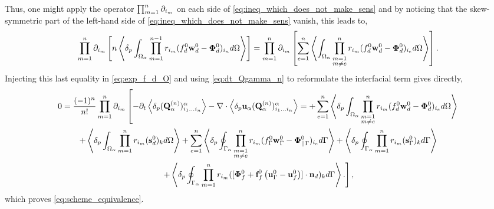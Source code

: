 Thus, one might apply the operator $\prod_{m=1}^{n} \partial_{i_m}$ on each side of \ref{eq:ineq_which_does_not_make_sens} and by noticing that the skew-symmetric part of the left-hand side of \ref{eq:ineq_which_does_not_make_sens} vanish, this leads to, 
\begin{equation*}
    \partialp{1}{n}\left[
        n\pavg{\int_{\Omega_\alpha} \pri{1}{n-1} ( f_d^0 \textbf{w}_d^0-\bm\Phi_d^0)_{i_n} d\Omega}
        \right]
    =
    \partialp{1}{n}\left[
    \sum_{e=1}^{n} 
    \avg{
        \intO{
        \prod^{n}_{\substack{ m=1 \\m \neq e}} r_{i_m} (f_d^0 \textbf{w}_d^0  - \bm\Phi_d^0)_{i_e}
        }
    }
    \right]. 
    \label{eq:it_make_sens_again}
\end{equation*}
Injecting this last equality in \ref{eq:exp_f_d_O} and using \ref{eq:dt_Qgamma_n} to reformulate the interfacial term gives directly, 
\begin{multline}
    0 = \frac{(-1)^n}{n!}
    \prod_{m=1}^{n} \partial_{i_m}
    \left[
        - \partial_t \left<\delta_p (\textbf{Q}_\alpha^{(n)})_{i_1\ldots i_n}^\alpha\right>
        - \mathbf{\nabla}\cdot  \left<\delta_p \textbf{u}_\alpha (\textbf{Q}_\alpha^{(n)})_{i_1\ldots i_n}^\alpha\right>
        =+\sum_{e=1}^{n} 
        \left<\delta_p \int_{\Omega_{\alpha}} 
            \prod^{n}_{\substack{ m=1 \\m \neq e}} r_{i_m} (f_d^0\textbf{w}_d^0  - \bm\Phi_d^0)_{i_e}
         d\Omega\right>\right.\\\left.
        + \left<\delta_p \int_{\Omega_{\alpha}}  \prod_{m=1}^{n} r_{i_m} (\textbf{s}_d^0)_k  d\Omega\right>
        +     
        \sum_{e=1}^{n} 
        \left<\delta_p \oint_{\Gamma_{\alpha}} 
            \prod^{n}_{\substack{ m=1 \\m \neq e}} r_{i_m} (f_\Gamma^0\textbf{w}_\Gamma^0 - \bm\Phi_{||\Gamma}^0)_{i_e}
         d\Gamma\right>
        + \left<\delta_p \oint_{\Gamma_{\alpha}}  \prod_{m=1}^{n} r_{i_m} (\textbf{s}_\Gamma^0)_k  d\Gamma\right> \right.\\\left.
        +\left<\delta_p \oint_{\Gamma_{\alpha}}  \prod_{m=1}^{n} r_{i_m} ([\bm\Phi_f^0 + \textbf{f}_f^0 \left(\textbf{u}_\Gamma^0 - \textbf{u}_f^0\right)]\cdot \textbf{n}_d)_k  d\Gamma\right>. 
    \right],
\end{multline}
which proves \ref{eq:scheme_equivalence}.
